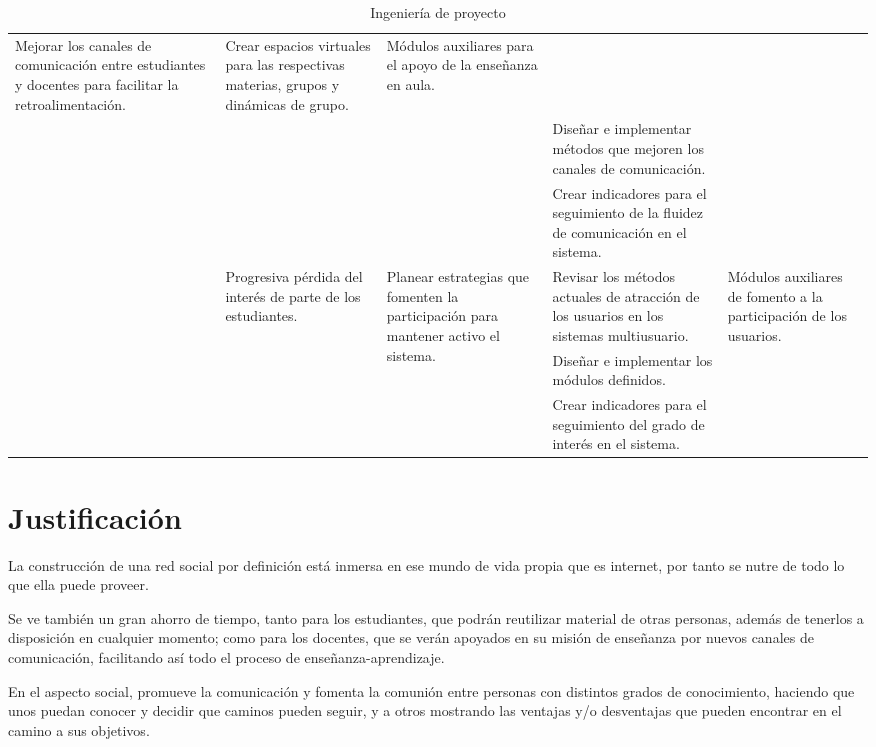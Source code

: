 \documentclass[letterpaper,11pt]{article}
\begin{document}
\begin{sidewaystable}
\begin{tabular}{|l|l|l|p{6.5cm}|l|}
\multirow{3}{3.5cm}{Mejorar los canales de comunicación entre estudiantes y docentes para facilitar
la retroalimentación.} &
Crear espacios virtuales para las respectivas materias, grupos y dinámicas de grupo. &
\multirow{3}{2.5cm}{Módulos auxiliares para el apoyo de la enseñanza en aula.} \\
\cline{4-4}
& & & Diseñar e implementar métodos que mejoren los canales de comunicación. & \\
\cline{4-4}
& & & Crear indicadores para el seguimiento de la fluidez de comunicación en el sistema. & \\
\cline{2-5}
& \multirow{3}{3cm}{Progresiva pérdida del interés de parte de los estudiantes.} &
\multirow{3}{3.5cm}{Planear estrategias que fomenten la participación para mantener activo el sistema.} &
Revisar los métodos actuales de atracción de los usuarios en los sistemas multiusuario. &
\multirow{3}{2.5cm}{Módulos auxiliares de fomento a la participación de los usuarios.} \\
\cline{4-4}
& & & Diseñar e implementar los módulos definidos. & \\
\cline{4-4}
& & & Crear indicadores para el seguimiento del grado de interés en el sistema. & \\
\hline
\end{tabular}
\caption{Ingeniería de proyecto}
\label{ingenieriadeproyecto}
\end{sidewaystable}

\section{Justificación}
La construcción de una red social por definición está inmersa en ese mundo de vida propia
que es internet, por tanto se nutre de todo lo que ella puede proveer.

Se ve también un gran ahorro de tiempo, tanto para los estudiantes, que podrán reutilizar
material de otras personas, además de tenerlos a disposición en cualquier momento;
como para los docentes, que se verán apoyados en su misión de enseñanza por nuevos
canales de comunicación, facilitando así todo el proceso de enseñanza-aprendizaje.

En el aspecto social, promueve la comunicación y fomenta la comunión entre personas
con distintos grados de conocimiento, haciendo que unos puedan conocer y decidir que
caminos pueden seguir, y a otros mostrando las ventajas y/o desventajas que pueden
encontrar en el camino a sus objetivos.
\end{document}
